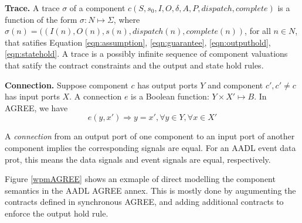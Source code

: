 {\bf Trace.}
A trace $\sigma$ of a component $c(S, s_0, I, O, \delta, A, P, dispatch, complete)$ is a function of the form $\sigma: N \mapsto \Sigma$, where
$\sigma(n) = ((I(n), O(n), s(n), dispatch(n), complete(n))$, for all $n\in N$, that satifies Equation \ref{eqn:assumption}, \ref{eqn:guarantee}, \ref{eqn:outputhold}, \ref{eqn:statehold}. %
A trace is a possibly infinite sequence of component valuations that satify the contract constraints and the output and state hold rules. 

{\bf Connection.}
Suppose component $c$ has output ports $Y$ and component $c', c' \neq c$ has input ports $X$. A connection $e$ is a Boolean function: $Y \times X' \mapsto B$. In AGREE, we have
\begin{equation} 
\label{eqn:connection}
e(y, x') \Rightarrow y = x', \forall y \in Y, \forall x \in X'
\end{equation} 

A \emph{connection} from an output port of one component to an input port of another component implies the corresponding signals are equal. For an AADL event data prot, this means the data signals and event signals are equal, respectively. 


Figure \ref{wpmAGREE} shows an exmaple of direct modelling the component semantics in the AADL AGREE annex. This is mostly done by augumenting the contracts defined in synchronous AGREE, and adding additional contracts to enforce the output hold rule.


